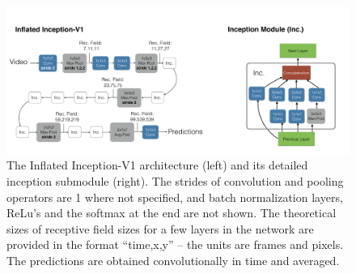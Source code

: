 \documentclass{article}
\begin{document}
\begin{figure}[ht]
    \centering
    \includegraphics[width=0.9\linewidth]{figs/i3d.png}
    \caption{The Inflated Inception-V1 architecture (left) and its detailed inception submodule (right). The strides of convolution and pooling
operators are 1 where not specified, and batch normalization layers, ReLu’s and the softmax at the end are not shown. The theoretical
sizes of receptive field sizes for a few layers in the network are provided in the format “time,x,y” – the units are frames and pixels. The
predictions are obtained convolutionally in time and averaged.\cite{carreira2018quovadisactionrecognition}}
    \label{fig:i3d}
\end{figure}
\end{document}
